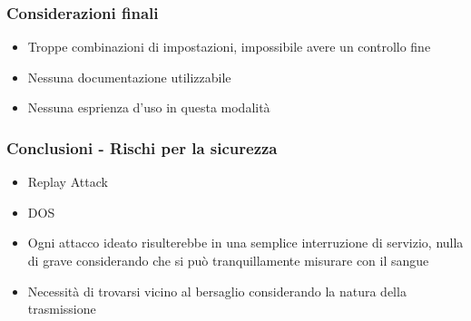 \documentclass{beamer}
\begin{document}
\begin{frame}
\frametitle{Considerazioni finali}
	\begin{itemize}
		\item Troppe combinazioni di impostazioni, impossibile avere un controllo fine 
		\item Nessuna documentazione utilizzabile
		\item Nessuna esprienza d'uso in questa modalità
	\end{itemize}
\end{frame}

\begin{frame}
\frametitle{Conclusioni - Rischi per la sicurezza}
	\begin{itemize}
		\item Replay Attack
		\item DOS
		\item Ogni attacco ideato risulterebbe in una semplice interruzione di servizio, nulla di grave considerando che si può tranquillamente misurare con il sangue
		\item Necessità di trovarsi vicino al bersaglio considerando la natura della trasmissione 
	\end{itemize}
\end{frame}
\end{document}
